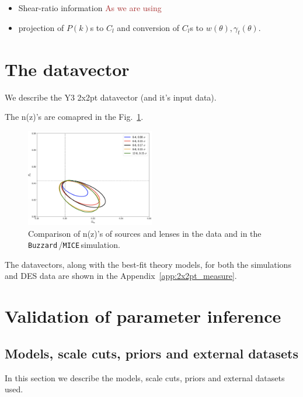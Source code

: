\documentclass[fleqn,usenatbib]{mnras}
\newcommand{\mice}{\texttt{MICE}\,}
\newcommand{\buzzard}{\texttt{Buzzard}\,}
\newcommand{\brown}[1]{\textcolor{brown}{#1}}
\begin{document}
\begin{itemize}
    \item Shear-ratio information
    \brown{As we are using }
    \item projection of $P(k)$s to $C_l$ and conversion of $C_l$s to $w(\theta),\gamma_t(\theta)$.
\end{itemize}



\section{The datavector}
We describe the Y3 2x2pt datavector (and it's input data).

The n(z)'s are comapred in the Fig.~\ref{fig:nz_comp}.

\begin{figure}
\includegraphics[width=0.5\textwidth,draft]{figs/temp.png}
\caption[]{Comparison of n(z)'s of sources and lenses in the data and in the \buzzard/\mice simulation. }
\label{fig:nz_comp}
\end{figure}

The datavectors, along with the best-fit theory models, for both the simulations and DES data are shown in the Appendix~\ref{app:2x2pt_measure}. 

\section{Validation of parameter inference}

\subsection{Models, scale cuts, priors and external datasets}
In this section we describe the models, scale cuts, priors and external datasets used.
\end{document}
